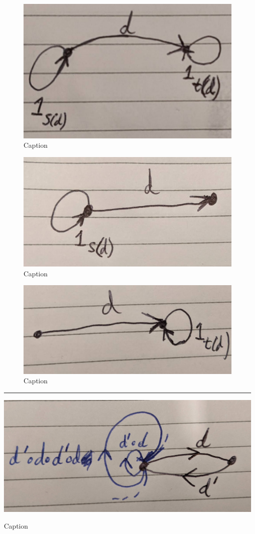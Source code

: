 \begin{figure}
    \centering
    \includegraphics[width=0.5\linewidth]{2MathematicalFramework/InitialFramework/Images/trivial_transformations_example_all_transformations.jpg}
    \caption{Caption}
    \label{fig:trivial_transformations_example_all_transformations}
\end{figure}

\begin{figure}
    \centering
    \includegraphics[width=0.5\linewidth]{2MathematicalFramework/InitialFramework/Images/right_trivial_transformation.jpg}
    \caption{Caption}
    \label{fig:right_trivial_transformation}
\end{figure}

\begin{figure}
    \centering
    \includegraphics[width=0.5\linewidth]{2MathematicalFramework/InitialFramework/Images/left_trivial_transformation.jpg}
    \caption{Caption}
    \label{fig:left_trivial_transformation}
\end{figure}



\noindent\rule{\textwidth}{1mm}

\begin{marginfigure}
    \centering
    \includegraphics[width=0.5\linewidth]{2MathematicalFramework/InitialFramework/Images/D_commonly_large.jpg}
    \caption{Caption}
    \label{fig:enter-label}
\end{marginfigure}

